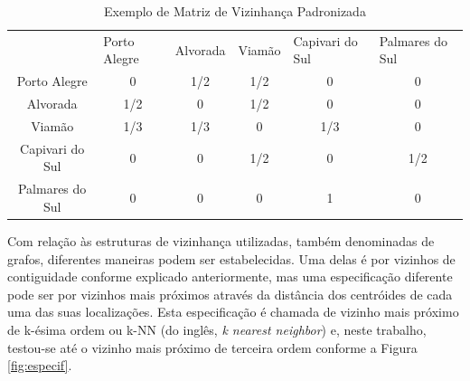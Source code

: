 \documentclass[12pt,openright,oneside,a4paper,english,french,spanish]{abntex2}
\numberwithin{table}{section} %
\numberwithin{figure}{section} %
\begin{document}
\begin{table}[H]
\centering
\caption{Exemplo de Matriz de Vizinhança Padronizada}
\label{tab:matriz_vizinhanca_pad}
\begin{tabular}{llllll}
                                     & Porto Alegre           & Alvorada               & Viamão                 & Capivari do Sul        & Palmares do Sul        \\ \cline{2-6} 
\multicolumn{1}{c|}{Porto Alegre}    & \multicolumn{1}{c|}{0} & \multicolumn{1}{c|}{1/2} & \multicolumn{1}{c|}{1/2} & \multicolumn{1}{c|}{0} & \multicolumn{1}{c|}{0} \\ \cline{2-6} 
\multicolumn{1}{c|}{Alvorada}        & \multicolumn{1}{c|}{1/2} & \multicolumn{1}{c|}{0} & \multicolumn{1}{c|}{1/2} & \multicolumn{1}{c|}{0} & \multicolumn{1}{c|}{0} \\ \cline{2-6} 
\multicolumn{1}{c|}{Viamão}          & \multicolumn{1}{c|}{1/3} & \multicolumn{1}{c|}{1/3} & \multicolumn{1}{c|}{0} & \multicolumn{1}{c|}{1/3} & \multicolumn{1}{c|}{0} \\ \cline{2-6} 
\multicolumn{1}{c|}{Capivari do Sul} & \multicolumn{1}{c|}{0} & \multicolumn{1}{c|}{0} & \multicolumn{1}{c|}{1/2} & \multicolumn{1}{c|}{0} & \multicolumn{1}{c|}{1/2} \\ \cline{2-6} 
\multicolumn{1}{c|}{Palmares do Sul} & \multicolumn{1}{c|}{0} & \multicolumn{1}{c|}{0} & \multicolumn{1}{c|}{0} & \multicolumn{1}{c|}{1} & \multicolumn{1}{c|}{0} \\ \cline{2-6} 
\end{tabular}
\end{table}

Com relação às estruturas de vizinhança utilizadas, também denominadas de grafos, diferentes maneiras podem ser estabelecidas. Uma delas é por vizinhos de contiguidade conforme explicado anteriormente, mas uma especificação diferente pode ser por vizinhos mais próximos através da distância dos centróides de cada uma das suas localizações. Esta especificação é chamada de vizinho mais próximo de k-ésima ordem ou k-NN (do inglês, \textit{k nearest neighbor}) e, neste trabalho, testou-se até o vizinho mais próximo de terceira ordem conforme a Figura \ref{fig:especif}.
\end{document}
